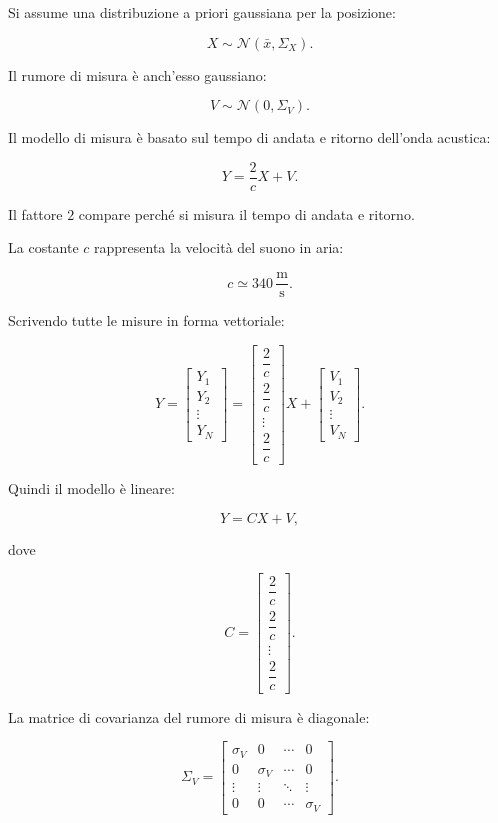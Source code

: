 \documentclass[11pt,a4paper]{article}
\begin{document}
Si assume una distribuzione a priori gaussiana per la posizione:

\[
X\sim\mathcal{N}(\bar x,\Sigma_X).
\]

Il rumore di misura è anch'esso gaussiano:

\[
V\sim\mathcal{N}(0,\Sigma_V).
\]

Il modello di misura è basato sul tempo di andata e ritorno dell'onda acustica:

\[
Y=\frac{2}{c}X+V.
\]

Il fattore \(2\) compare perché si misura il tempo di andata e ritorno.

La costante \(c\) rappresenta la velocità del suono in aria:

\[
c \simeq 340 \,\frac{\mathrm{m}}{\mathrm{s}}.
\]

Scrivendo tutte le misure in forma vettoriale:

\[
Y=
\begin{bmatrix}
Y_1\\
Y_2\\
\vdots\\
Y_N
\end{bmatrix}
=
\begin{bmatrix}
\dfrac{2}{c}\\[0.4em]
\dfrac{2}{c}\\
\vdots\\
\dfrac{2}{c}
\end{bmatrix}X
+
\begin{bmatrix}
V_1\\
V_2\\
\vdots\\
V_N
\end{bmatrix}.
\]

Quindi il modello è lineare:

\[
Y=CX+V,
\]

dove

\[
C=
\begin{bmatrix}
\dfrac{2}{c}\\[0.4em]
\dfrac{2}{c}\\
\vdots\\
\dfrac{2}{c}
\end{bmatrix}.
\]

La matrice di covarianza del rumore di misura è diagonale:

\[
\Sigma_V=
\begin{bmatrix}
\sigma_V & 0 & \cdots & 0\\
0 & \sigma_V & \cdots & 0\\
\vdots & \vdots & \ddots & \vdots\\
0 & 0 & \cdots & \sigma_V
\end{bmatrix}.
\]
\end{document}
